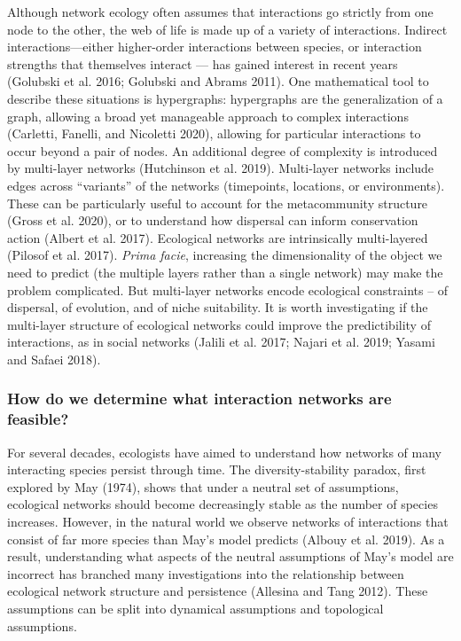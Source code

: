 \documentclass[10pt,oneside]{article}
\begin{document}
Although network ecology often assumes that interactions go strictly
from one node to the other, the web of life is made up of a variety of
interactions. Indirect interactions---either higher-order interactions
between species, or interaction strengths that themselves interact ---
has gained interest in recent years (Golubski et al. 2016; Golubski and
Abrams 2011). One mathematical tool to describe these situations is
hypergraphs: hypergraphs are the generalization of a graph, allowing a
broad yet manageable approach to complex interactions (Carletti,
Fanelli, and Nicoletti 2020), allowing for particular interactions to
occur beyond a pair of nodes. An additional degree of complexity is
introduced by multi-layer networks (Hutchinson et al. 2019). Multi-layer
networks include edges across ``variants'' of the networks (timepoints,
locations, or environments). These can be particularly useful to account
for the metacommunity structure (Gross et al. 2020), or to understand
how dispersal can inform conservation action (Albert et al. 2017).
Ecological networks are intrinsically multi-layered (Pilosof et al.
2017). \emph{Prima facie}, increasing the dimensionality of the object
we need to predict (the multiple layers rather than a single network)
may make the problem complicated. But multi-layer networks encode
ecological constraints -- of dispersal, of evolution, and of niche
suitability. It is worth investigating if the multi-layer structure of
ecological networks could improve the predictibility of interactions, as
in social networks (Jalili et al. 2017; Najari et al. 2019; Yasami and
Safaei 2018).

\hypertarget{how-do-we-determine-what-interaction-networks-are-feasible}{%
\subsubsection{How do we determine what interaction networks are
feasible?}\label{how-do-we-determine-what-interaction-networks-are-feasible}}

For several decades, ecologists have aimed to understand how networks of
many interacting species persist through time. The diversity-stability
paradox, first explored by May (1974), shows that under a neutral set of
assumptions, ecological networks should become decreasingly stable as
the number of species increases. However, in the natural world we
observe networks of interactions that consist of far more species than
May's model predicts (Albouy et al. 2019). As a result, understanding
what aspects of the neutral assumptions of May's model are incorrect has
branched many investigations into the relationship between ecological
network structure and persistence (Allesina and Tang 2012). These
assumptions can be split into dynamical assumptions and topological
assumptions.
\end{document}
